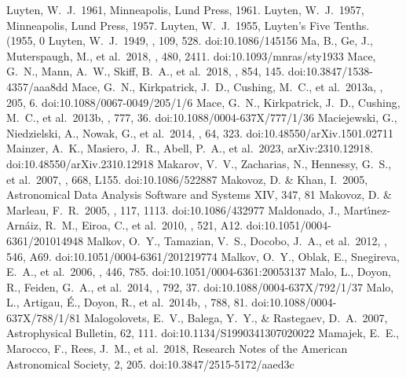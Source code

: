 \documentclass[twocolumn,tighten,twocolappendix]{aastex631}
\begin{document}
\begin{thebibliography}{}
 Luyten, W.~J.\ 1961, Minneapolis, Lund Press, 1961.
 Luyten, W.~J.\ 1957, Minneapolis, Lund Press, 1957.
 Luyten, W.~J.\ 1955, Luyten's Five Tenths. (1955, 0
 Luyten, W.~J.\ 1949, \apj, 109, 528. doi:10.1086/145156
 Ma, B., Ge, J., Muterspaugh, M., et al.\ 2018, \mnras, 480, 2411. doi:10.1093/mnras/sty1933
 Mace, G.~N., Mann, A.~W., Skiff, B.~A., et al.\ 2018, \apj, 854, 145. doi:10.3847/1538-4357/aaa8dd
 Mace, G.~N., Kirkpatrick, J.~D., Cushing, M.~C., et al.\ 2013a, \apjs, 205, 6. doi:10.1088/0067-0049/205/1/6
 Mace, G.~N., Kirkpatrick, J.~D., Cushing, M.~C., et al.\ 2013b, \apj, 777, 36. doi:10.1088/0004-637X/777/1/36
 Maciejewski, G., Niedzielski, A., Nowak, G., et al.\ 2014, \actaa, 64, 323. doi:10.48550/arXiv.1501.02711
 Mainzer, A.~K., Masiero, J.~R., Abell, P.~A., et al.\ 2023, arXiv:2310.12918. doi:10.48550/arXiv.2310.12918
 Makarov, V.~V., Zacharias, N., Hennessy, G.~S., et al.\ 2007, \apjl, 668, L155. doi:10.1086/522887
 Makovoz, D. \& Khan, I.\ 2005, Astronomical Data Analysis Software and Systems XIV, 347, 81
 Makovoz, D. \& Marleau, F.~R.\ 2005, \pasp, 117, 1113. doi:10.1086/432977
 Maldonado, J., Mart{\'\i}nez-Arn{\'a}iz, R.~M., Eiroa, C., et al.\ 2010, \aap, 521, A12. doi:10.1051/0004-6361/201014948
 Malkov, O.~Y., Tamazian, V.~S., Docobo, J.~A., et al.\ 2012, \aap, 546, A69. doi:10.1051/0004-6361/201219774
 Malkov, O.~Y., Oblak, E., Snegireva, E.~A., et al.\ 2006, \aap, 446, 785. doi:10.1051/0004-6361:20053137
 Malo, L., Doyon, R., Feiden, G.~A., et al.\ 2014, \apj, 792, 37. doi:10.1088/0004-637X/792/1/37
 Malo, L., Artigau, {\'E}., Doyon, R., et al.\ 2014b, \apj, 788, 81. doi:10.1088/0004-637X/788/1/81
 Malogolovets, E.~V., Balega, Y.~Y., \& Rastegaev, D.~A.\ 2007, Astrophysical Bulletin, 62, 111. doi:10.1134/S1990341307020022
 Mamajek, E.~E., Marocco, F., Rees, J.~M., et al.\ 2018, Research Notes of the American Astronomical Society, 2, 205. doi:10.3847/2515-5172/aaed3c

\end{thebibliography}
\end{document}
